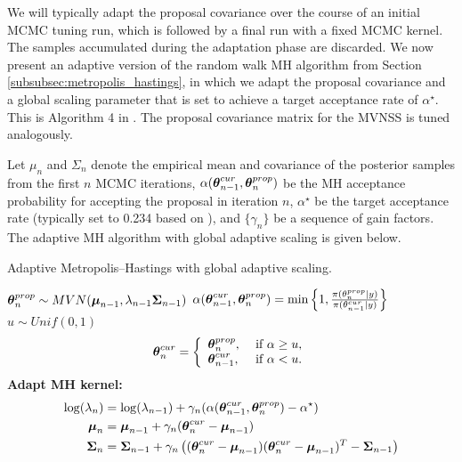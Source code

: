 We will typically adapt the proposal covariance over the course of an initial MCMC tuning run, which is followed by a final run with a fixed MCMC kernel. The samples accumulated during the adaptation phase are discarded. We now present an adaptive version of the random walk MH algorithm from Section \ref{subsubsec:metropolis_hastings}, in which we adapt the proposal covariance and a global scaling parameter that is set to achieve a target acceptance rate of $ \alpha^\star. $ This is Algorithm 4 in \cite{andrieu2008tutorial}. The proposal covariance matrix for the MVNSS is tuned analogously.

Let $ \mu_n $ and $ \Sigma_n $ denote the empirical mean and covariance of the posterior samples from the first $ n $ MCMC iterations, $ \alpha(\boldsymbol{\theta}^{cur}_{n-1},\boldsymbol{\theta}^{prop}_{n}) $ be the MH acceptance probability for accepting the proposal in iteration $ n$, $ \alpha^\star $ be the target acceptance rate (typically set to 0.234 based on \cite{roberts2001optimal}), and $ \lbrace\gamma_n\rbrace $ be a sequence of gain factors. The adaptive MH algorithm with global adaptive scaling is given below.

\begin{algorithm}[htbp]
	\caption{Adaptive Metropolis--Hastings with global adaptive scaling.}
	\label{alg:adaptive_MH}
	\begin{algorithmic}[1]
			\State $ \boldsymbol{\theta}^{prop}_n \sim MVN(\boldsymbol{\mu}_{n-1},\lambda_{n-1}\boldsymbol{\Sigma}_{n-1}) $ 
			\State $ \alpha(\boldsymbol{\theta}^{cur}_{n-1},\boldsymbol{\theta}^{prop}_n) = \min\left \lbrace 1, \frac{\pi(\theta^{prop}_n|y)}{\pi(\theta^{cur}_{n-1}|y)}\right \rbrace $ 
			\State $ u\sim Unif(0,1) $ 
			\begin{equation*}
			\boldsymbol{\theta}^{cur}_n= \left\lbrace \begin{array}{ll}
			\boldsymbol{\theta}^{prop}_n,&\ \text{if}\ \alpha \geq u,\\
			\boldsymbol{\theta}^{cur}_{n-1},&\ \text{if}\ \alpha < u.
			\end{array} \right.
			\end{equation*}
			\State \textbf{Adapt MH kernel:}\vspace{-0.1in}
			\begin{align*}
			\log(\lambda_{n}) &= \log(\lambda_{n-1}) + \gamma_n(\alpha(\boldsymbol{\theta}_{n-1}^{cur},\boldsymbol{\theta}_n^{prop}) - \alpha^\star) \\
			\boldsymbol{\mu}_n &= \boldsymbol{\mu}_{n-1} + \gamma_n(\boldsymbol{\theta}^{cur}_n - \boldsymbol{\mu}_{n-1}) \\
			\boldsymbol{\Sigma}_n &= \boldsymbol{\Sigma}_{n-1} + \gamma_n\left ((\boldsymbol{\theta}^{cur}_n - \boldsymbol{\mu}_{n-1})(\boldsymbol{\theta}^{cur}_n - \boldsymbol{\mu}_{n-1})^T - \boldsymbol{\Sigma}_{n-1}\right )
			\end{align*}
		\EndFor
		\EndProcedure
	\end{algorithmic}
\end{algorithm}